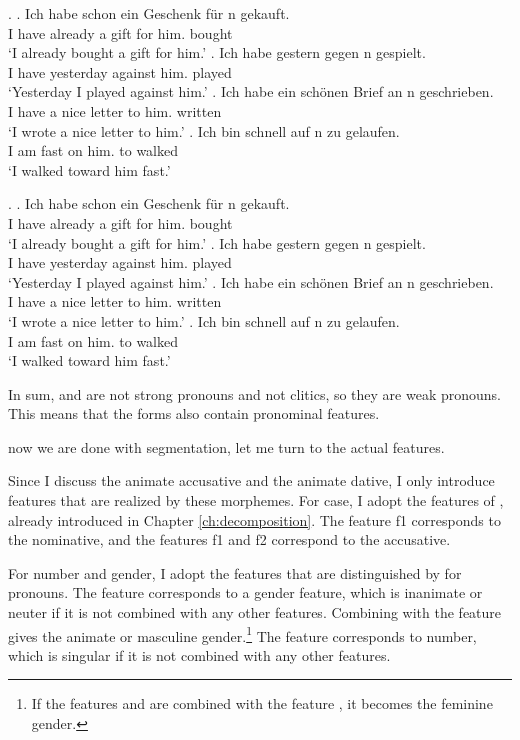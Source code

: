 \ex.\label{ex:wk-pron-prep-n}
\ag. Ich habe schon ein Geschenk für n gekauft.\\
 I have already a gift for him. bought\\
 `I already bought a gift for him.'
\bg. Ich habe gestern gegen n gespielt.\\
I have yesterday against him. played\\
`Yesterday I played against him.'
\bg. Ich habe ein schönen Brief an n geschrieben.\\
I have a nice letter to him. written\\
`I wrote a nice letter to him.'
\bg. Ich bin schnell auf n zu gelaufen.\\
I am fast on him. to walked\\
`I walked toward him fast.'

\ex.\label{ex:wk-pron-prep-m}
\ag. Ich habe schon ein Geschenk für n gekauft.\\
 I have already a gift for him. bought\\
 `I already bought a gift for him.'
\bg. Ich habe gestern gegen n gespielt.\\
I have yesterday against him. played\\
`Yesterday I played against him.'
\bg. Ich habe ein schönen Brief an n geschrieben.\\
I have a nice letter to him. written\\
`I wrote a nice letter to him.'
\bg. Ich bin schnell auf n zu gelaufen.\\
I am fast on him. to walked\\
`I walked toward him fast.'

In sum,  and  are not strong pronouns and not clitics, so they are weak pronouns.
This means that the forms also contain pronominal features.




now we are done with segmentation, let me turn to the actual features.

Since I discuss the animate accusative and the animate dative, I only introduce features that are realized by these morphemes.
For case, I adopt the features of \citet{caha2009}, already introduced in Chapter \ref{ch:decomposition}. The feature \ac{f}1 corresponds to the nominative, and the features \ac{f}1 and \ac{f}2 correspond to the accusative.

For number and gender, I adopt the features that are distinguished by \citet{harley2002} for pronouns. The feature  corresponds to a gender feature, which is inanimate or neuter if it is not combined with any other features. Combining  with the feature  gives the animate or masculine gender.\footnote{
If the features  and  are combined with the feature , it becomes the feminine gender.
}
The feature  corresponds to number, which is singular if it is not combined with any other features.

